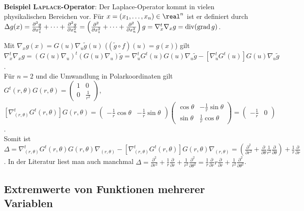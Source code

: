 \linie

\textbf{Beispiel \textsc{Laplace}-Operator}:
Der Laplace-Operator kommt in vielen physikalischen Bereichen vor.
Für $x = (x_1, \dotsc, x_n) \in \real^n$ ist er definiert durch \\
$\Delta g(x) = \frac{\partial^2 g}{\partial x_1^2} + \dotsb +
\frac{\partial^2 g}{\partial x_n^2} =
\left(\frac{\partial^2}{\partial x_1^2} + \dotsb +
\frac{\partial^2}{\partial x_n^2}\right) g = \nabla_x^t \nabla_x g =
\operatorname{div}(\operatorname{grad} g)$.

Mit $\nabla_x g(x) = G(u) \nabla_u \widetilde{g}(u)$
($(\widetilde{g} \circ f)(u) = g(x)$) gilt \\
$\nabla_x^t \nabla_x g = (G(u) \nabla_u)^t (G(u) \nabla_u) \widetilde{g} =
\nabla_u^t G^t(u) G(u) \nabla_u \widetilde{g} -
[\nabla_u^t G^t(u)] G(u) \nabla_u \widetilde{g}$. \\
Für $n = 2$ und die Umwandlung in Polarkoordinaten gilt
$G^t(r, \theta) G(r, \theta) = \begin{pmatrix}1 & 0 \\
0 & \frac{1}{r^2}\end{pmatrix}$, \\
$[\nabla_{(r,\theta)}^t G^t(r, \theta)] G(r, \theta) =
\begin{pmatrix}-\frac{1}{r} \cos \theta &
-\frac{1}{r} \sin \theta\end{pmatrix} \begin{pmatrix}
\cos \theta & -\frac{1}{r} \sin \theta \\
\sin \theta & \frac{1}{r} \cos \theta\end{pmatrix} =
\begin{pmatrix}-\frac{1}{r} & 0\end{pmatrix}$. \\
Somit ist
$\Delta = \nabla_{(r,\theta)}^t G^t(r, \theta) G(r, \theta) \nabla_{(r,\theta)}
- [\nabla_{(r,\theta)}^t G^t(r, \theta)] G(r, \theta) \nabla_{(r,\theta)} =
\left(\frac{\partial^2}{\partial r^2} + \frac{\partial}{\partial \theta}
\frac{1}{r^2} \frac{\partial}{\partial \theta}\right) + \frac{1}{r}
\frac{\partial}{\partial r}$.
In der Literatur liest man auch manchmal
$\Delta = \frac{\partial^2}{\partial r^2} +
\frac{1}{r} \frac{\partial}{\partial r} +
\frac{1}{r^2} \frac{\partial^2}{\partial \theta^2} =
\frac{1}{r} \frac{\partial}{\partial r} r \frac{\partial}{\partial r} + 
\frac{1}{r^2} \frac{\partial^2}{\partial \theta^2}$.

\pagebreak

\subsection{%
    Extremwerte von Funktionen mehrerer Variablen%
}


